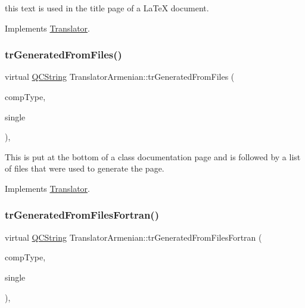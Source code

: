 this text is used in the title page of a La\+TeX document. 

Implements \mbox{\hyperlink{class_translator}{Translator}}.

\mbox{\label{class_translator_armenian_aa116da0fd78ac563220aee5624764155}} 
\subsubsection{\texorpdfstring{trGeneratedFromFiles()}{trGeneratedFromFiles()}}
{\footnotesize\ttfamily virtual \mbox{\hyperlink{class_q_c_string}{Q\+C\+String}} Translator\+Armenian\+::tr\+Generated\+From\+Files (\begin{DoxyParamCaption}\item[{\mbox{\hyperlink{class_class_def_ae70cf86d35fe954a94c566fbcfc87939}{Class\+Def\+::\+Compound\+Type}}}]{comp\+Type,  }\item[{bool}]{single }\end{DoxyParamCaption})\hspace{0.3cm}{\ttfamily [inline]}, {\ttfamily [virtual]}}

This is put at the bottom of a class documentation page and is followed by a list of files that were used to generate the page. 

Implements \mbox{\hyperlink{class_translator}{Translator}}.

\mbox{\label{class_translator_armenian_aeeccedcc2c8306f7c36f3e51c5e54cc0}} 
\subsubsection{\texorpdfstring{trGeneratedFromFilesFortran()}{trGeneratedFromFilesFortran()}}
{\footnotesize\ttfamily virtual \mbox{\hyperlink{class_q_c_string}{Q\+C\+String}} Translator\+Armenian\+::tr\+Generated\+From\+Files\+Fortran (\begin{DoxyParamCaption}\item[{\mbox{\hyperlink{class_class_def_ae70cf86d35fe954a94c566fbcfc87939}{Class\+Def\+::\+Compound\+Type}}}]{comp\+Type,  }\item[{bool}]{single }\end{DoxyParamCaption})\hspace{0.3cm}{\ttfamily [inline]}, {\ttfamily [virtual]}}

